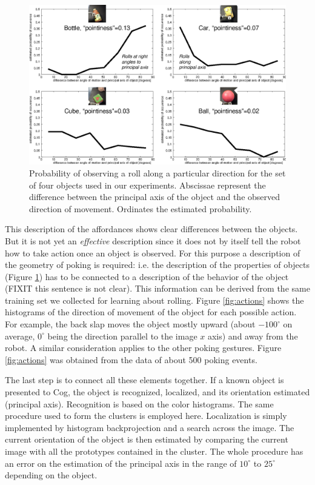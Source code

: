 \begin{figure}[tbh]
\begin{center}
\includegraphics[width=\columnwidth]{affordances.eps}
\caption{ 
\label{fig:affordances}
%
Probability of observing a roll along a particular direction for the set
of four objects used in our experiments. Abscissae represent the difference
between the principal axis of the object and the observed direction of 
movement. Ordinates the estimated probability.
%
}
\end{center}
\end{figure}

This description of the affordances shows clear differences between the
objects.
But it is not yet an {\em effective} description since
it does not by itself tell the robot how to take
action once an object is observed. For this purpose a description of 
the geometry of poking is required: i.e. the description of the properties of 
objects (Figure \ref{fig:affordances}) has to be connected to a description
of the behavior of the object (FIXIT this sentence is not clear). 
This information can be derived from the same training set we collected for learning
about rolling. Figure \ref{fig:actions} shows the histograms of the direction 
of movement of the object for
each possible action. For example, the back slap moves the object mostly upward
(about $-100^\circ$ on average, $0^\circ$ being the direction parallel to the image
$x$ axis) and away from the robot. A similar consideration applies
to the other poking gestures. Figure \ref{fig:actions} was obtained from the data of
about 500 poking events.

The last step is to connect all these elements together. If a known object is
presented to Cog, the object is recognized, localized, and
its orientation estimated (principal axis). Recognition is based on the color histograms. The same
procedure used to form the clusters is employed here. Localization is simply implemented 
by histogram backprojection and a search across the image. The current orientation of the
object is then estimated by comparing the current image with all the prototypes 
contained in the cluster. The whole procedure has an error on the estimation
of the principal axis in the range of $10^\circ$ to $25^\circ$ depending on the object.  

